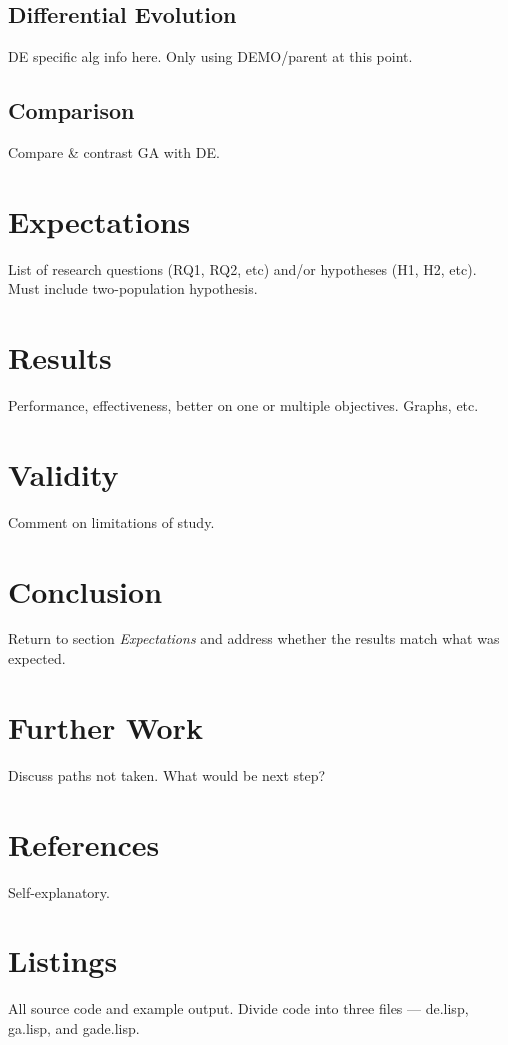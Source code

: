 \documentclass{sig-alternate}
\begin{document}
\subsection{Differential Evolution}
DE specific alg info here. Only using DEMO/parent at this point.

\subsection{Comparison}
Compare \& contrast GA with DE.

\section{Expectations}
List of research questions (RQ1, RQ2, etc) and/or hypotheses
(H1, H2, etc).  Must include two-population hypothesis.

\section{Results}
Performance, effectiveness, better on one or multiple
objectives.  Graphs, etc.

\section{Validity}
Comment on limitations of study.

\section{Conclusion}
Return to section \emph{Expectations} and address whether the results
match what was expected.

\section{Further Work}
Discuss paths not taken.  What would be next step?

\section{References}
Self-explanatory.

\section{Listings}
All source code and example output.  Divide code into three files
--- de.lisp, ga.lisp, and gade.lisp.
\end{document}
